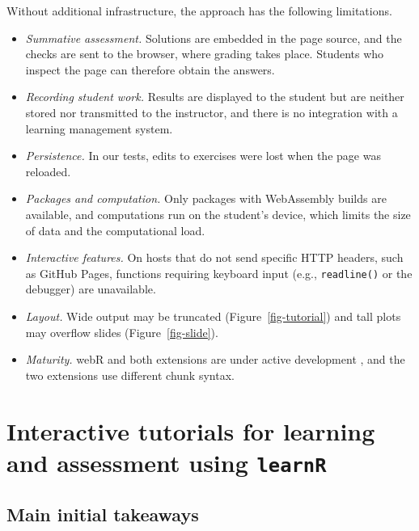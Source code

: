 \documentclass[
  12pt]{article}
\providecommand{\tightlist}{%
  \setlength{\itemsep}{0pt}\setlength{\parskip}{0pt}}
\begin{document}
Without additional infrastructure, the approach has the following
limitations.

\begin{itemize}
\tightlist
\item
  \emph{Summative assessment.} Solutions are embedded in the page
  source, and the checks are sent to the browser, where grading takes
  place. Students who inspect the page can therefore obtain the answers.
\item
  \emph{Recording student work.} Results are displayed to the student
  but are neither stored nor transmitted to the instructor, and there is
  no integration with a learning management system.
\item
  \emph{Persistence.} In our tests, edits to exercises were lost when
  the page was reloaded.
\item
  \emph{Packages and computation.} Only packages with WebAssembly builds
  are available, and computations run on the student's device, which
  limits the size of data and the computational load.
\item
  \emph{Interactive features.} On hosts that do not send specific HTTP
  headers, such as GitHub Pages, functions requiring keyboard input
  (e.g., \texttt{readline()} or the debugger) are unavailable.
\item
  \emph{Layout.} Wide output may be truncated
  (Figure~\ref{fig-tutorial}) and tall plots may overflow slides
  (Figure~\ref{fig-slide}).
\item
  \emph{Maturity.} webR and both extensions are under active development
  \citep{webRdocs}, and the two extensions use different chunk syntax.
\end{itemize}

\section{\texorpdfstring{Interactive tutorials for learning and
assessment using
\texttt{learnR}}{Interactive tutorials for learning and assessment using learnR}}\label{sec-learnr}

\subsection{Main initial takeaways}\label{main-initial-takeaways}
\end{document}
